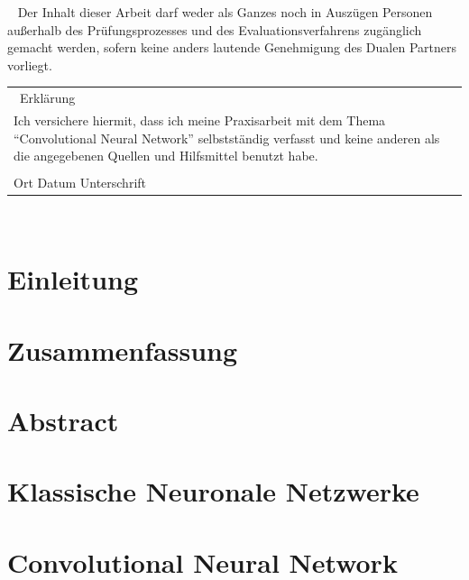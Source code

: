 \documentclass[12pt,oneside, 
liststotoc, 						%
bibtotoc,						%
titlepage, 						%
abstracton,					%
DIV11,						%
]{scrreprt}
\newcommand{\titel}{Convolutional Neural Network}
\begin{document}

\clearpage

\begingroup
~
\vfill
\noindent Der Inhalt dieser Arbeit darf weder als Ganzes noch in Auszügen Personen außerhalb des Prüfungsprozesses und des Evaluationsverfahrens zugänglich gemacht werden, sofern keine anders lautende Genehmigung des Dualen Partners vorliegt.
\vfill
~
\endgroup
~\clearpage
~\vfill
\begin{tabular}{|p{\linewidth}|}
\hline
~\hfill Erklärung \hfill~ \\[12pt]
Ich versichere hiermit, dass ich meine Praxisarbeit mit dem Thema ``\titel'' selbstständig verfasst und keine anderen als die angegebenen Quellen und Hilfsmittel benutzt habe.\\
\vspace{1cm}
\underline{\hspace{5cm}}\hspace{2cm}\underline{\hspace{5cm}}\\[6pt]
Ort \hspace{1cm} Datum \hspace{4cm} Unterschrift\\
\hline
\end{tabular}
\vfill ~
\clearpage
\rmfamily
\chapter{Einleitung}
\clearpage

\chapter{Zusammenfassung}
\clearpage

\chapter{Abstract}
\clearpage

\chapter{Klassische Neuronale Netzwerke}
\clearpage

\chapter{Convolutional Neural Network}

\clearpage
\end{document}
